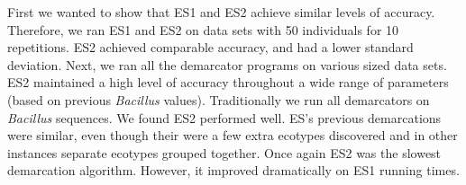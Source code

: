 First we wanted to show that ES1 and ES2 achieve similar levels of accuracy.
Therefore, we ran ES1 and ES2 on data sets with 50 individuals for 10 repetitions.
ES2 achieved comparable accuracy, and had a lower standard deviation.
Next, we ran all the demarcator programs on various sized data sets.
ES2 maintained a high level of accuracy throughout a wide range of parameters (based on previous \emph{Bacillus} values).
Traditionally we run all demarcators on \emph{Bacillus} sequences.
We found ES2 performed well.
ES's previous demarcations were similar, even though their were a few extra ecotypes discovered and in other instances separate ecotypes grouped together.
Once again ES2 was the slowest demarcation algorithm.
However, it improved dramatically on ES1 running times.


